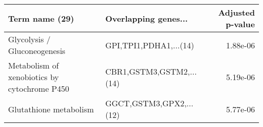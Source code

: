 \begin{tabular}{llr}
\toprule
                              Term name (29) &     Overlapping genes... &  Adjusted p-value \\
\midrule
                Glycolysis / Gluconeogenesis &   GPI,TPI1,PDHA1,...(14) &          1.88e-06 \\
Metabolism of xenobiotics by cytochrome P450 & CBR1,GSTM3,GSTM2,...(14) &          5.19e-06 \\
                      Glutathione metabolism &  GGCT,GSTM3,GPX2,...(12) &          5.77e-06 \\
\bottomrule
\end{tabular}
